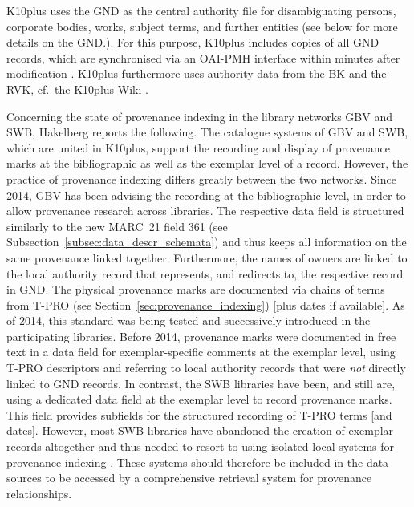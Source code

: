 K10plus uses the \gls{GND} as the central authority file for disambiguating
persons, corporate bodies, works, subject terms, 
and further entities (see below for more details on the GND.).
For this purpose, K10plus includes 
copies of all \gls{GND} records, which are synchronised via an \gls{OAI-PMH} interface
within minutes after modification \autocite[cf.][]{K10plusHandbuchNormdaten}.
K10plus furthermore uses authority data from the \gls{BK} and the \gls{RVK},
cf.\ the K10plus Wiki \autocite{K10plusWikiNormdaten}.

Concerning the state of provenance indexing in the library networks \gls{GBV} and \gls{SWB},
Hakelberg \autocite*[§4]{Hakelberg2016} reports the following.
The catalogue systems of \gls{GBV} and \gls{SWB}, which are united in K10plus,
support the recording and display
of provenance marks at the bibliographic as well as the exemplar level of a record.
However, the practice of provenance indexing differs greatly between the two networks.
Since 2014, GBV has been advising the recording at the bibliographic level,
in order to allow provenance research across libraries. The respective data field
is structured similarly to the new MARC~21 field 361 (see Subsection~\ref{subsec:data_descr_schemata})
and thus keeps all information on the same provenance linked together.
Furthermore, the names of owners are linked
to the local authority record that represents, and redirects to, the respective record in \gls{GND}.
The physical provenance marks are documented via chains of terms from
\gls{T-PRO} (see Section~\ref{sec:provenance_indexing}) [plus dates if available].
As of 2014,
this standard was being tested and successively introduced in the participating libraries.
Before 2014, provenance marks were documented in free text in a data field for
exemplar-specific comments at the exemplar level, using \gls{T-PRO} descriptors 
and referring to local authority records that were \emph{not} directly linked to \gls{GND} records.
In contrast, the \gls{SWB} libraries have been, and still are, using a dedicated data field
at the exemplar level to record provenance marks.
This field provides subfields for the structured recording of T-PRO terms [and dates].
However, most \gls{SWB} libraries have abandoned the creation of exemplar records altogether
and thus needed to resort to using isolated local systems for provenance indexing \autocite[cf.][]{Hakelberg2016}.
These systems should therefore be included in the data sources to be accessed by a comprehensive retrieval system
for provenance relationships.

